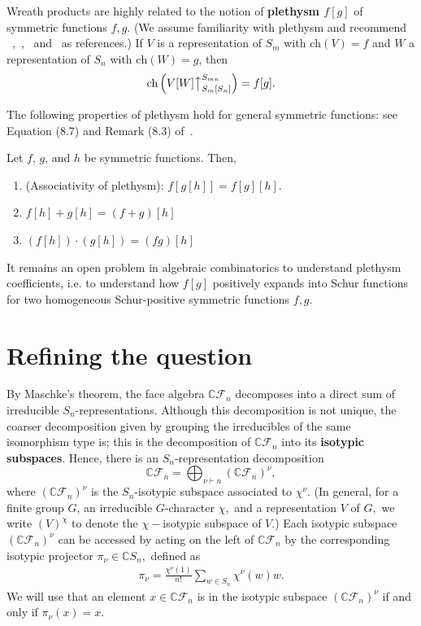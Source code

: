 \documentclass[ALCO, Unicode]{cedram}
\def\ch{\mathrm{ch}}
\def\C{{\mathbb{C}}}
\def\ch{\mathrm{ch}}
\begin{document}
Wreath products are highly related to the notion of \textbf{plethysm $f[g]$} of symmetric functions $f, g.$ (We assume familiarity with plethysm and recommend ~\cite[Ch. 7 Appendix 2]{ec2},~\cite{plethystic-calculus},~\cite[\S 4]{sundaram1995plethysm} and~\cite[\S 1.8]{macdonald} as references.) If $V$ is a representation of $S_m$ with $\ch(V) = f$ and $W$ a representation of $S_n$ with $\ch(W) = g$, then \[\ch\left( V[W] \big \uparrow_{S_m[S_n]}^{S_{mn}}\right) = f[g].\]

The following properties of plethysm hold for general symmetric functions: see Equation (8.7) and Remark (8.3) of~\cite{macdonald}. 

\begin{lemma} \label{prop:plethysm-properties}     Let $f$, $g$, and $h$ be symmetric functions. Then, 
    \begin{enumerate}
        \item (Associativity of plethysm): $f \left[ g \left [ h \right] \right] = f [g][h].$
        \item $f[h] + g[h] = (f + g)[h]$
        \item $(f[h])\cdot (g[h]) = (fg)[h]$
    \end{enumerate}
\end{lemma} 

It remains an open problem in algebraic combinatorics to understand plethysm coefficients, i.e. to understand how $f[g]$ positively expands into Schur functions for two homogeneous Schur-positive symmetric functions $f, g.$


\section{Refining the question}\label{sec:quest}
By Maschke's theorem, the face algebra $\C\mathcal{F}_n$ decomposes into a direct sum of irreducible $S_n$-representations. Although this decomposition is not unique, the coarser decomposition given by grouping the irreducibles of the same isomorphism type is; this is the decomposition of $\C \mathcal{F}_n$ into its \textbf{isotypic subspaces}. Hence, there is an $S_n$-representation decomposition \[\C\mathcal{F}_n = \bigoplus_{\nu \vdash n}\left(\C \mathcal{F}_n \right)^\nu,\] where $\left(\C \mathcal{F}_n\right)^\nu$ is the $S_n$-isotypic subspace associated to $\chi^\nu.$ (In general, for a finite group $G$, an irreducible $G$-character $\chi,$ and a representation $V$ of $G,$ we write $\left(V\right)^\chi$ to denote the $\chi-$isotypic subspace of $V.$) Each isotypic subspace $\left(\C \mathcal{F}_n \right)^\nu$ can be accessed by acting on the left of $\C \mathcal{F}_n$ by the corresponding isotypic projector \textbf{$\pi_\nu \in \C S_n,$} defined as
\begin{align*}
    \pi_\nu = \frac{\chi^\nu(1)}{n!}\sum_{w \in S_n}\chi^\nu(w)w.
\end{align*}
 We will use that an element $x \in \C \mathcal{F}_n$ is in the isotypic subspace $\left(\C \mathcal{F}_n\right)^\nu$ if and only if $\pi_\nu(x) = x.$
\end{document}
